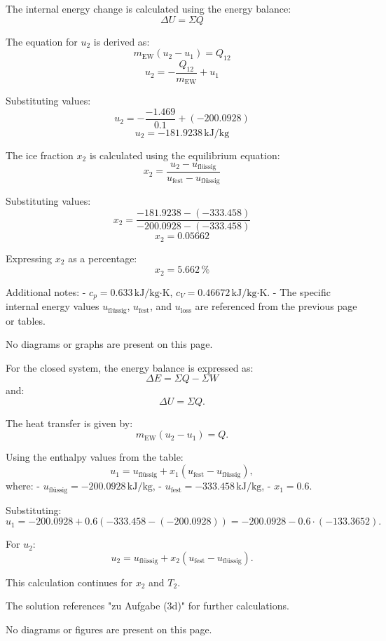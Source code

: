 The internal energy change is calculated using the energy balance:  
\[
\Delta U = \Sigma Q
\]  

The equation for \( u_2 \) is derived as:  
\[
m_{\text{EW}} (u_2 - u_1) = Q_{12}
\]  
\[
u_2 = -\frac{Q_{12}}{m_{\text{EW}}} + u_1
\]  

Substituting values:  
\[
u_2 = -\frac{-1.469}{0.1} + (-200.0928)
\]  
\[
u_2 = -181.9238 \, \text{kJ/kg}
\]  

The ice fraction \( x_2 \) is calculated using the equilibrium equation:  
\[
x_2 = \frac{u_2 - u_{\text{flüssig}}}{u_{\text{fest}} - u_{\text{flüssig}}}
\]  

Substituting values:  
\[
x_2 = \frac{-181.9238 - (-333.458)}{-200.0928 - (-333.458)}
\]  
\[
x_2 = 0.05662
\]  

Expressing \( x_2 \) as a percentage:  
\[
x_2 = 5.662 \, \%
\]  

Additional notes:  
- \( c_p = 0.633 \, \text{kJ/kg·K} \), \( c_V = 0.46672 \, \text{kJ/kg·K} \).  
- The specific internal energy values \( u_{\text{flüssig}} \), \( u_{\text{fest}} \), and \( u_{\text{loss}} \) are referenced from the previous page or tables.  

No diagrams or graphs are present on this page.

For the closed system, the energy balance is expressed as:  
\[
\Delta E = \Sigma Q - \Sigma W
\]  
and:  
\[
\Delta U = \Sigma Q.
\]  

The heat transfer is given by:  
\[
m_{\text{EW}} (u_2 - u_1) = Q.
\]  

Using the enthalpy values from the table:  
\[
u_1 = u_{\text{flüssig}} + x_1 (u_{\text{fest}} - u_{\text{flüssig}}),
\]  
where:  
- \( u_{\text{flüssig}} = -200.0928 \, \text{kJ/kg} \),  
- \( u_{\text{fest}} = -333.458 \, \text{kJ/kg} \),  
- \( x_1 = 0.6 \).  

Substituting:  
\[
u_1 = -200.0928 + 0.6 (-333.458 - (-200.0928)) = -200.0928 - 0.6 \cdot (-133.3652).
\]  

For \( u_2 \):  
\[
u_2 = u_{\text{flüssig}} + x_2 (u_{\text{fest}} - u_{\text{flüssig}}).
\]  

This calculation continues for \( x_2 \) and \( T_2 \).  

The solution references "zu Aufgabe (3d)" for further calculations.  

No diagrams or figures are present on this page.